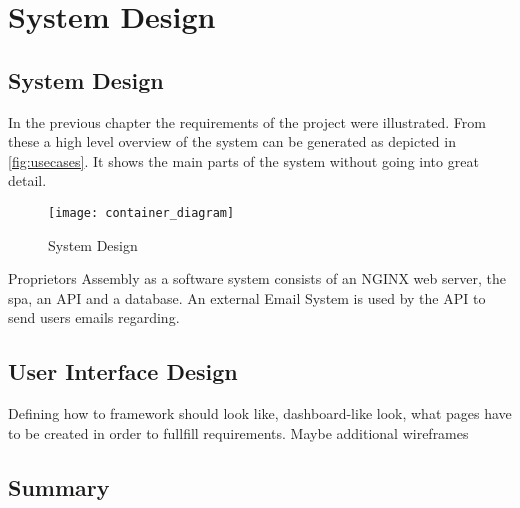 \chapter[System Design]{System Design}

\section{System Design}
In the previous chapter the requirements of the project were illustrated. From these a high level overview of the system can be generated as depicted in \autoref{fig:usecases}. It shows the main parts of the system without going into great detail. 


\begin{figure}[H]
    \begin{center}
    \texttt{[image: container\_diagram]}
    \end{center}
    \caption{System Design}
    \label{fig:usecases}
\end{figure}

Proprietors Assembly as a software system consists of an NGINX web server, the \acrlong{spa}, an API and a database. An external Email System is used by the API to send users emails regarding.

\section{User Interface Design}
Defining how to framework should look like, dashboard-like look, what pages have to be created in order to fullfill requirements. Maybe additional wireframes

\section{Summary}
